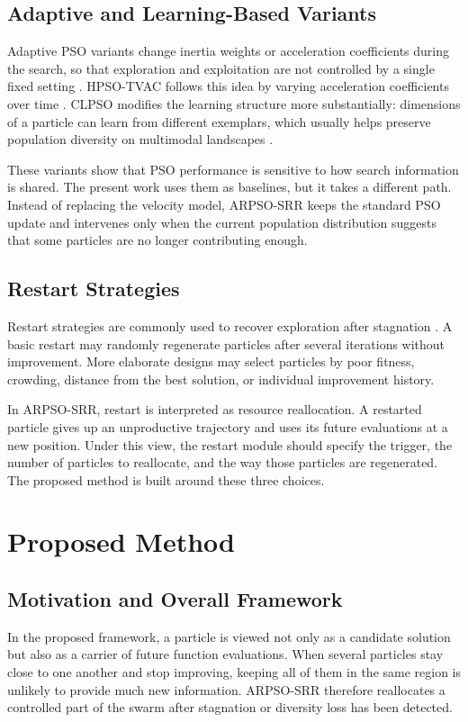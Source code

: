 \documentclass[conference]{IEEEtran}
\begin{document}
\subsection{Adaptive and Learning-Based Variants}
Adaptive PSO variants change inertia weights or acceleration coefficients during the search, so that exploration and exploitation are not controlled by a single fixed setting \cite{b2,b12}. HPSO-TVAC follows this idea by varying acceleration coefficients over time \cite{b11}. CLPSO modifies the learning structure more substantially: dimensions of a particle can learn from different exemplars, which usually helps preserve population diversity on multimodal landscapes \cite{b4}.

These variants show that PSO performance is sensitive to how search information is shared. The present work uses them as baselines, but it takes a different path. Instead of replacing the velocity model, ARPSO-SRR keeps the standard PSO update and intervenes only when the current population distribution suggests that some particles are no longer contributing enough.

\subsection{Restart Strategies}
Restart strategies are commonly used to recover exploration after stagnation \cite{b13,b14}. A basic restart may randomly regenerate particles after several iterations without improvement. More elaborate designs may select particles by poor fitness, crowding, distance from the best solution, or individual improvement history.

In ARPSO-SRR, restart is interpreted as resource reallocation. A restarted particle gives up an unproductive trajectory and uses its future evaluations at a new position. Under this view, the restart module should specify the trigger, the number of particles to reallocate, and the way those particles are regenerated. The proposed method is built around these three choices.

\section{Proposed Method}\label{sec:method}

\subsection{Motivation and Overall Framework}
In the proposed framework, a particle is viewed not only as a candidate solution but also as a carrier of future function evaluations. When several particles stay close to one another and stop improving, keeping all of them in the same region is unlikely to provide much new information. ARPSO-SRR therefore reallocates a controlled part of the swarm after stagnation or diversity loss has been detected.
\end{document}
